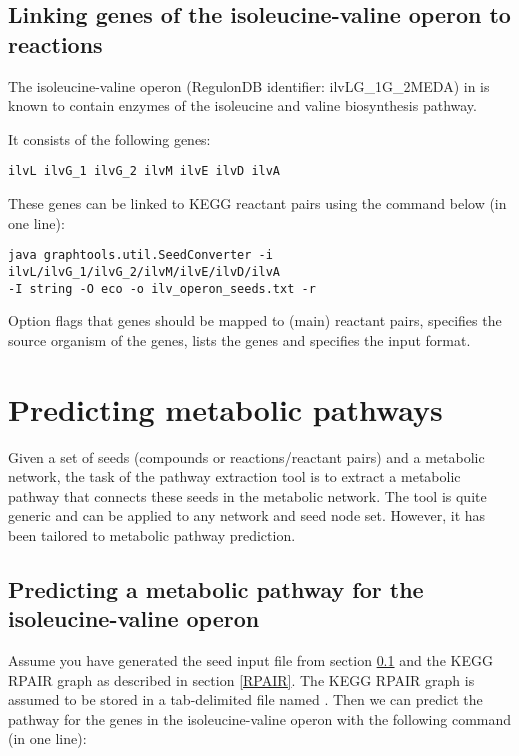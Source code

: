 \subsection{Linking genes of the isoleucine-valine operon to
reactions}\label{ilv_operon}

The isoleucine-valine operon (RegulonDB identifier: ilvLG\_1G\_2MEDA) in
 is known to contain enzymes of
the isoleucine and valine biosynthesis pathway. 

It consists of the following genes:

\begin{lstlisting}
ilvL ilvG_1 ilvG_2 ilvM ilvE ilvD ilvA
\end{lstlisting}

These genes can be linked to KEGG reactant pairs using the command below (in one
line):

\begin{verbatim}
java graphtools.util.SeedConverter -i ilvL/ilvG_1/ilvG_2/ilvM/ilvE/ilvD/ilvA 
-I string -O eco -o ilv_operon_seeds.txt -r
\end{verbatim}

Option  flags that genes should be mapped to (main) reactant pairs,
 specifies the source organism of the genes,  lists the
genes and  specifies the input format.

\section{Predicting metabolic pathways}

Given a set of seeds (compounds or reactions/reactant pairs) and a metabolic
network, the task of the pathway extraction tool is to extract a metabolic
pathway that connects these seeds in the metabolic network. The tool is quite generic and can be
applied to any network and seed node set. However, it has been tailored to
metabolic pathway prediction.

\subsection{Predicting a metabolic pathway for the isoleucine-valine operon}

Assume you have generated the seed input file from section \ref{ilv_operon} and
the KEGG RPAIR graph as described in section \ref{RPAIR}. The KEGG RPAIR graph
is assumed to be stored in a tab-delimited file named
. Then we can predict the pathway for the
genes in the isoleucine-valine operon with the following command (in one line):

